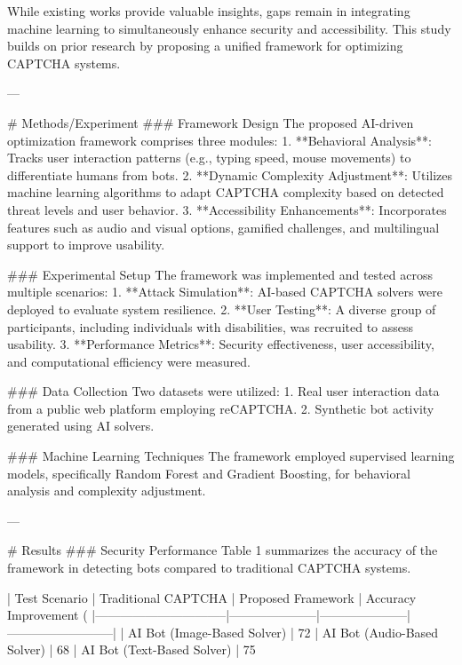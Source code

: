 While existing works provide valuable insights, gaps remain in integrating machine learning to simultaneously enhance security and accessibility. This study builds on prior research by proposing a unified framework for optimizing CAPTCHA systems.

---

# Methods/Experiment  
### Framework Design  
The proposed AI-driven optimization framework comprises three modules:  
1. **Behavioral Analysis**: Tracks user interaction patterns (e.g., typing speed, mouse movements) to differentiate humans from bots.  
2. **Dynamic Complexity Adjustment**: Utilizes machine learning algorithms to adapt CAPTCHA complexity based on detected threat levels and user behavior.  
3. **Accessibility Enhancements**: Incorporates features such as audio and visual options, gamified challenges, and multilingual support to improve usability.

### Experimental Setup  
The framework was implemented and tested across multiple scenarios:  
1. **Attack Simulation**: AI-based CAPTCHA solvers were deployed to evaluate system resilience.  
2. **User Testing**: A diverse group of participants, including individuals with disabilities, was recruited to assess usability.  
3. **Performance Metrics**: Security effectiveness, user accessibility, and computational efficiency were measured.

### Data Collection  
Two datasets were utilized:  
1. Real user interaction data from a public web platform employing reCAPTCHA.  
2. Synthetic bot activity generated using AI solvers.  

### Machine Learning Techniques  
The framework employed supervised learning models, specifically Random Forest and Gradient Boosting, for behavioral analysis and complexity adjustment.

---

# Results  
### Security Performance  
Table 1 summarizes the accuracy of the framework in detecting bots compared to traditional CAPTCHA systems.

| Test Scenario                  | Traditional CAPTCHA | Proposed Framework | Accuracy Improvement (%
|--------------------------------|---------------------|---------------------|--------------------------|
| AI Bot (Image-Based Solver)    | 72%
| AI Bot (Audio-Based Solver)    | 68%
| AI Bot (Text-Based Solver)     | 75%

